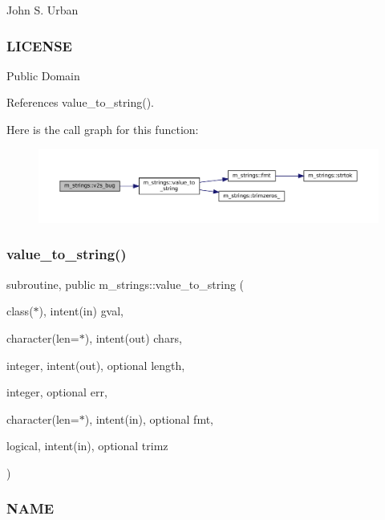 John S. Urban \subsubsection*{L\+I\+C\+E\+N\+SE}

Public Domain 

References value\+\_\+to\+\_\+string().

Here is the call graph for this function\+:\nopagebreak
\begin{figure}[H]
\begin{center}
\leavevmode
\includegraphics[width=350pt]{namespacem__strings_a76a00e3ca7fb7c9b9cadcd484c6e3946_cgraph}
\end{center}
\end{figure}
\mbox{\label{namespacem__strings_a5dcd73626c8909c12f8ea29028927a88}} 
\subsubsection{\texorpdfstring{value\+\_\+to\+\_\+string()}{value\_to\_string()}}
{\footnotesize\ttfamily subroutine, public m\+\_\+strings\+::value\+\_\+to\+\_\+string (\begin{DoxyParamCaption}\item[{class($\ast$), intent(in)}]{gval,  }\item[{character(len=$\ast$), intent(out)}]{chars,  }\item[{integer, intent(out), optional}]{length,  }\item[{integer, optional}]{err,  }\item[{character(len=$\ast$), intent(in), optional}]{fmt,  }\item[{logical, intent(in), optional}]{trimz }\end{DoxyParamCaption})}



\subsubsection*{N\+A\+ME}

